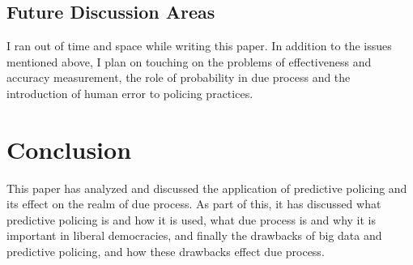 \documentclass[12pt]{article} %
\begin{document}


%
%

\subsection{Future Discussion Areas}
I ran out of time and space while writing this paper. In addition to the issues mentioned above, I plan on touching on the problems of effectiveness and accuracy measurement, the role of probability in due process and the introduction of human error to policing practices.

\section{Conclusion}\label{sec:conclusion}
This paper has analyzed and discussed the application of predictive policing and its effect on the realm of due process. As part of this, it has discussed what predictive policing is and how it is used, what due process is and why it is important in liberal democracies, and finally the drawbacks of big data and predictive policing, and how these drawbacks effect due process.
\end{document}
